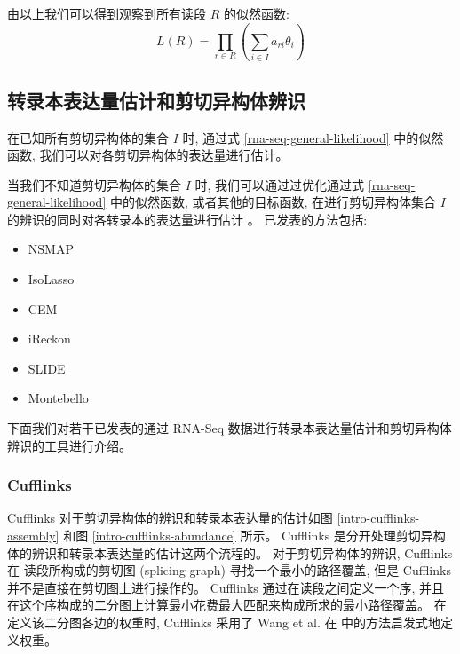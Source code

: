 由以上我们可以得到观察到所有读段 $R$ 的似然函数: 
\begin{equation}
\label{rna-seq-general-likelihood}
L(R) = \prod_{r \in R} (\sum_{i \in I} a_{ri} \theta_i)
\end{equation}

\subsection{转录本表达量估计和剪切异构体辨识}
在已知所有剪切异构体的集合 $I$ 时, 通过式 \eqref{rna-seq-general-likelihood} 中的似然函数, 
我们可以对各剪切异构体的表达量进行估计。 

当我们不知道剪切异构体的集合 $I$ 时, 
我们可以通过过优化通过式 \eqref{rna-seq-general-likelihood} 中的似然函数, 
或者其他的目标函数, 在进行剪切异构体集合 $I$ 的辨识的同时对各转录本的表达量进行估计 
\cite{xing2006expectation}。 
已发表的方法包括: 
\begin{itemize}
\item NSMAP \cite{nsmap.21575225}

\item IsoLasso \cite{isolasso.recomb}

\item CEM \cite{Li15112012}

\item iReckon \cite{Mezlini29112012}

\item SLIDE \cite{Li13122011}

\item Montebello \cite{Hiller.Montebello}
\end{itemize}

下面我们对若干已发表的通过 RNA-Seq 数据进行转录本表达量估计和剪切异构体辨识的工具进行介绍。 

\subsubsection{Cufflinks}
Cufflinks 对于剪切异构体的辨识和转录本表达量的估计如图 \ref{intro-cufflinks-assembly} 
和图 \ref{intro-cufflinks-abundance} 所示。 
Cufflinks 是分开处理剪切异构体的辨识和转录本表达量的估计这两个流程的。 
对于剪切异构体的辨识, Cufflinks 在 读段所构成的剪切图 
(splicing graph) \cite{Heber01072002} 寻找一个最小的路径覆盖, 
但是 Cufflinks 并不是直接在剪切图上进行操作的。 
Cufflinks 通过在读段之间定义一个序, 
并且在这个序构成的二分图上计算最小花费最大匹配来构成所求的最小路径覆盖。 
在定义该二分图各边的权重时, Cufflinks 采用了 Wang et al. 在  
中的方法启发式地定义权重。

